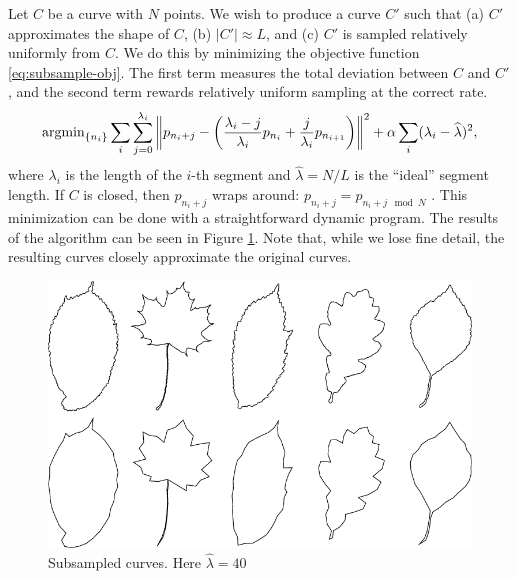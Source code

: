 Let $C$ be a curve with $N$ points. We wish to produce a curve $C'$
such that (a) $C'$ approximates the shape of $C$, (b) $|C'| \approx
L$, and (c) $C'$ is sampled relatively uniformly from $C$. We do this
by minimizing the objective function \eqref{eq:subsample-obj}. The first
term measures the total deviation between $C$ and $C'$, and the second
term rewards relatively uniform sampling at the correct rate.
\begin{equation}
\argmin_{ \{n_i \} } \sum_i \sum_{j=0}^{\lambda_i} \left\| p_{n_i+j} -
  \left( \frac{\lambda_i - j}{\lambda_i} p_{n_i} + \frac{j}{\lambda_i}
    p_{n_{i+1}} \right) \right\|^2 + \alpha \sum_i (\lambda_i -
\widehat{\lambda})^2,\label{eq:subsample-obj}
\end{equation}
where $\lambda_i$ is the length of the $i$-th segment and
$\widehat{\lambda} = N/L$ is the ``ideal'' segment length. If $C$ is
closed, then $p_{n_i + j}$ wraps around: $p_{n_i + j} = p_{n_i+j \mod
  N}$ . This minimization can be done with a straightforward dynamic
program. The results of the algorithm can be seen in Figure
\ref{fig-subsample}. Note that, while we lose fine detail, the
resulting curves closely approximate the original curves.
\begin{figure}[h]
\centering
\includegraphics[width=120mm]{images/subsample.png} 
\caption{Subsampled curves. Here $\widehat{\lambda} = 40$}
\label{fig-subsample}
\end{figure}

